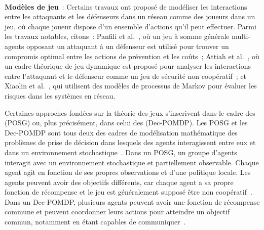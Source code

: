 \

\noindent
\textbf{Modèles de jeu}~: \quad Certains travaux ont proposé de modéliser les interactions entre les attaquants et les défenseurs dans un réseau comme des joueurs dans un jeu, où chaque joueur dispose d'un ensemble d'actions qu'il peut effectuer.
Parmi les travaux notables, citons~: Panfili et al.~\cite{MPanfili2018}, où un jeu à somme générale multi-agents opposant un attaquant à un défenseur est utilisé pour trouver un compromis optimal entre les actions de prévention et les coûts~; Attiah et al.~\cite{AAttiah2018}, où un cadre théorique de jeu dynamique est proposé pour analyser les interactions entre l'attaquant et le défenseur comme un jeu de sécurité non coopératif~; et Xiaolin et al.~\cite{CXiaolin2008}, qui utilisent des modèles de processus de Markov pour évaluer les risques dans les systèmes en réseau.

\noindent
Certaines approches fondées sur la théorie des jeux s'inscrivent dans le cadre des  (POSG) ou, plus précisément, dans celui des  (Dec-POMDP). Les POSG et les Dec-POMDP sont tous deux des cadres de modélisation mathématique des problèmes de prise de décision dans lesquels des agents interagissent entre eux et dans un environnement stochastique~\cite{beynier2010}. Dans un POSG, un groupe d'agents interagit avec un environnement stochastique et partiellement observable. Chaque agent agit en fonction de ses propres observations et d'une politique locale. Les agents peuvent avoir des objectifs différents, car chaque agent a sa propre fonction de récompense et le jeu est généralement supposé être non coopératif~\cite{terry2020pettingzoo}. Dans un Dec-POMDP, plusieurs agents peuvent avoir une fonction de récompense commune et peuvent coordonner leurs actions pour atteindre un objectif commun, notamment en étant capables de communiquer~\cite{bernstein2013}.

\

